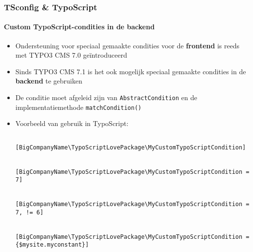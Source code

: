 \begin{frame}[fragile]
	\frametitle{TSconfig \& TypoScript}
	\framesubtitle{Custom TypoScript-condities in de backend}

	\lstset{basicstyle=\tiny\ttfamily}

	\begin{itemize}
	
		\item Ondersteuning voor speciaal gemaakte condities voor de \textbf{frontend} is reeds met
		TYPO3 CMS 7.0 geïntroduceerd
		\item Sinds TYPO3 CMS 7.1 is het ook mogelijk speciaal gemaakte condities in de \textbf{backend} te gebruiken
		\item De conditie moet afgeleid zijn van \texttt{AbstractCondition} en de implementatiemethode \texttt{matchCondition()}
		\item Voorbeeld van gebruik in TypoScript: 

			\begin{lstlisting}
				[BigCompanyName\TypoScriptLovePackage\MyCustomTypoScriptCondition]

				[BigCompanyName\TypoScriptLovePackage\MyCustomTypoScriptCondition = 7]

				[BigCompanyName\TypoScriptLovePackage\MyCustomTypoScriptCondition = 7, != 6]

				[BigCompanyName\TypoScriptLovePackage\MyCustomTypoScriptCondition = {$mysite.myconstant}]
			\end{lstlisting}

	\end{itemize}

\end{frame}


